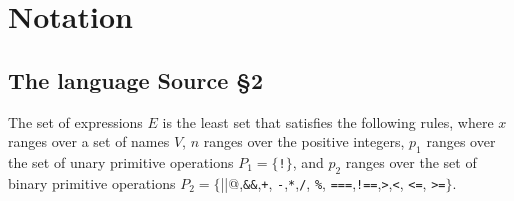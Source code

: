 

\newcommand{\Rule}[2]{\genfrac{}{}{0.7pt}{}{{\setlength{\fboxrule}{0pt}\setlength{\fboxsep}{3mm}\fbox{$#1$}}}{{\setlength{\fboxrule}{0pt}\setlength{\fboxsep}{3mm}\fbox{$#2$}}}}

\newcommand{\TruE}{\textbf{\texttt{true}}}
\newcommand{\FalsE}{\textbf{\texttt{false}}}
\newcommand{\AndOp}{\texttt{\&\&}}
\newcommand{\OrOp}{\texttt{||}}
\newcommand{\ThenOp}{\texttt{?}}
\newcommand{\ElseOp}{\texttt{:}}
\newcommand{\Rc}{\texttt{\}}}
\newcommand{\Lc}{\texttt{\{}}
\newcommand{\Rp}{\texttt{)}}
\newcommand{\Lp}{\texttt{(}}
\newcommand{\Fun}{\textbf{\texttt{function}}}
\newcommand{\Let}{\textbf{\texttt{let}}}
\newcommand{\Return}{\textbf{\texttt{return}}}
\newcommand{\Const}{\textbf{\texttt{const}}}
\newcommand{\If}{\textbf{\texttt{if}}}
\newcommand{\Else}{\textbf{\texttt{else}}}
\newcommand{\Bool}{\texttt{bool}}
\newcommand{\Number}{\texttt{number}}
\newcommand{\String}{\texttt{string}}
\newcommand{\Undefined}{\texttt{undefined}}
\newcommand{\Pair}{\textit{Pair}}
\newcommand{\Pred}{\textit{Pred}}
\newcommand{\head}{\textit{head}}
\newcommand{\tail}{\textit{tail}}
\newcommand{\type}{\textit{type}}
\newcommand{\polytype}{\textit{polytype}}
\newcommand{\predtype}{\textit{predtype}}
\newcommand{\ExtractPos}{\ensuremath{\textit{Extract}^+}}
\newcommand{\ExtractNeg}{\ensuremath{\textit{Extract}^-}}

\newtheorem{definition}{Definition}[section]




\section{Notation}  

\subsection{The language Source \S2}

The set of expressions $E$ is the least set that satisfies the following rules, 
where $x$ ranges over a set of names $V$, $n$ ranges over the positive integers, 
$p_1$ ranges over the set of unary primitive operations 
$P_1 = \{$\verb#!#$\}$, and $p_2$ ranges over the set of binary 
primitive operations
$P_2 = \{$\verb@||@,\verb#&&#,\verb#+#,
\verb#-#,\verb#*#,\verb#/#, \verb#%#, \verb#===#,\verb#!==#,\verb#>#,\verb#<#, \verb#<=#, \verb#>=#$\}$.

